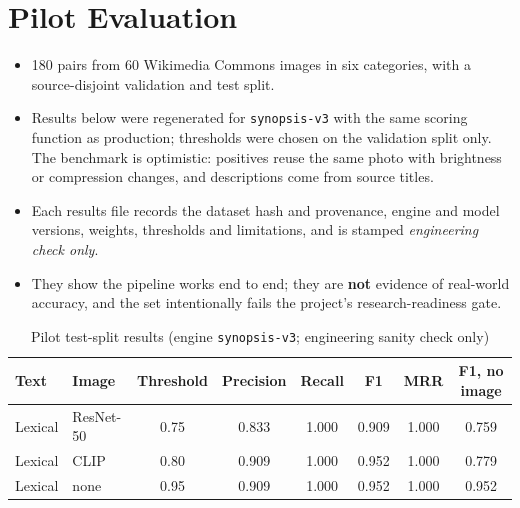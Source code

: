 \documentclass[12pt,a4paper,oneside]{report}
\newcommand{\code}[1]{\texttt{#1}}
\begin{document}
\section{Pilot Evaluation}
\begin{itemize}
  \item 180 pairs from 60 Wikimedia Commons images in six categories, with a source-disjoint validation and test split.
  \item Results below were regenerated for \code{synopsis-v3} with the same scoring function as production; thresholds were chosen on the validation split only. The benchmark is optimistic: positives reuse the same photo with brightness or compression changes, and descriptions come from source titles.
  \item Each results file records the dataset hash and provenance, engine and model versions, weights, thresholds and limitations, and is stamped \emph{engineering check only}.
  \item They show the pipeline works end to end; they are \textbf{not} evidence of real-world accuracy, and the set intentionally fails the project's research-readiness gate.
\end{itemize}
\begin{table}[H]
\centering\small
\caption[Pilot test-split results]{Pilot test-split results (engine \code{synopsis-v3}; engineering sanity check only)}
\label{tab:pilot}
\footnotesize
\begin{tabular}{llcccccc}
\toprule
Text & Image & Threshold & Precision & Recall & F1 & MRR & F1, no image\\
\midrule
Lexical & ResNet-50 & 0.75 & 0.833 & 1.000 & 0.909 & 1.000 & 0.759\\
Lexical & CLIP & 0.80 & 0.909 & 1.000 & 0.952 & 1.000 & 0.779\\
Lexical & none & 0.95 & 0.909 & 1.000 & 0.952 & 1.000 & 0.952\\
\bottomrule
\end{tabular}
\end{table}
\end{document}
